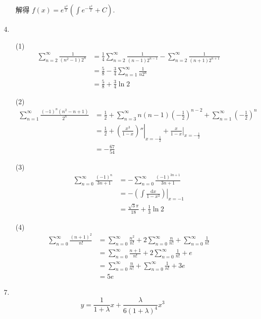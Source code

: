 \documentclass[oneside]{ctexbook} %
\begin{document}
\begin{enumerate}
\begin{enumerate}
        解得 $\displaystyle f(x) = e^{\frac {x^2} 2} \left( \int e^{-\frac {x^2} 2} + C \right)$.
    \end{enumerate}
    \item[4.]
    \begin{enumerate}
        \item[(1)]
        $$
        \begin{aligned}
            \sum_{n=2}^{\infty} \frac 1 {(n^2-1) 2^n} &= \frac 1 4 \sum_{n=2}^{\infty} \frac 1 {(n-1) 2^{n-1}} - \sum_{n=2}^{\infty} \frac 1 {(n+1) 2^{n+1}} \\
            &= \frac 5 8 - \frac 3 4 \sum_{n=1}^{\infty} \frac 1 {n 2^n} \\
            &= \frac 5 8 + \frac 3 4 \ln 2
        \end{aligned}
        $$
        \item[(2)]
        $$
        \begin{aligned}
            \sum_{n=1}^{\infty} \frac{(-1)^n (n^2-n+1)}{2^n} &= \frac 1 2 + \sum_{n=3}^{\infty} n(n-1) \left( - \frac 1 2 \right)^{n-2} + \sum_{n=1}^{\infty} \left( -\frac 1 2 \right)^n \\
            &= \frac 1 2 + \left. \left( \frac{x^3}{1 - x} \right)'' \right|_{x = - \frac 1 2} + \left. \frac x {1 - x} \right|_{x = - \frac 1 2} \\
            &= - \frac{67}{54}
        \end{aligned}
        $$
        \item[(3)]
        $$
        \begin{aligned}
            \sum_{n=0}^{\infty} \frac{(-1)^n}{3n+1} &= - \sum_{n=0}^{\infty} \frac{(-1)^{3n+1}}{3n+1} \\
            &= - \left. \left( \int \frac{\mathrm dx}{1 - x^3} \right) \right|_{x=-1} \\
            &= \frac{\sqrt 3 \pi}{18} + \frac 1 3 \ln 2
        \end{aligned}
        $$
        \item[(4)]
        $$
        \begin{aligned}
            \sum_{n=0}^{\infty} \frac{(n+1)^2}{n!} &= \sum_{n=0}^{\infty} \frac{n^2}{n!} + 2 \sum_{n=0}^{\infty} \frac n {n!} + \sum_{n=0}^{\infty} \frac 1 {n!} \\
            &= \sum_{n=0}^{\infty} \frac{n+1}{n!} + 2 \sum_{n=0}^{\infty} \frac 1 {n!} + e \\
            &= \sum_{n=0}^{\infty} \frac n {n!} + \sum_{n=0}^{\infty} \frac 1 {n!} + 3e \\
            &= 5e
        \end{aligned}
        $$
    \end{enumerate}
    \item[7.]
    $$
    y = \frac 1 {1 + \lambda} x + \frac{\lambda}{6 (1 + \lambda)^4} x^3
    $$
\end{enumerate}
\end{document}
